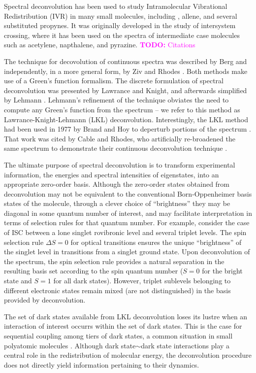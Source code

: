 \documentclass[12pt]{mitthesis}
\newcommand{\TODO} [1]{\textcolor{magenta}{\textbf{TODO:} #1}}
\begin{document}
Spectral deconvolution has been used to study Intramolecular
Vibrational Redistribution (IVR) in many small molecules, including
, allene, and several substituted propynes.  It was originally
developed in the study of intersystem crossing, where it has been used
on the spectra of intermediate case molecules such as acetylene,
napthalene, and pyrazine. \TODO{Citations}

The technique for decovolution of continuous spectra was described by
Berg and independently, in a more general form, by Ziv and Rhodes
\cite{berg76, ziv76}.  Both methods make use of a Green's function
formalism.  The discrete formulation of spectral deconvolution was
presented by Lawrance and Knight, and afterwards simplified by Lehmann
\cite{lawrance85, lehmann91}.  Lehmann's refinement of the technique
obviates the need to compute any Green's function from the spectrum --
we refer to this method as Lawrance-Knight-Lehmann (LKL)
deconvolution.  Interestingly, the LKL method had been used in 1977 by
Brand and Hoy to deperturb portions of the  spectrum
\cite{brand77}.  That work was cited by Cable and Rhodes, who
artificially re-broadened the same spectrum to demonstrate their
continuous deconvolution technique \cite{cable80}.

The ultimate purpose of spectral deconvolution is to transform
experimental information, the energies and spectral intensities of
eigenstates, into an appropriate zero-order basis.  Although the
zero-order states obtained from deconvolution may not be equivalent to
the conventional Born-Oppenheimer basis states of the molecule,
through a clever choice of ``brightness'' they may be diagonal in some
quantum number of interest, and may facilitate interpretation in terms
of selection rules for that quantum number.  For example, consider the
case of ISC between a lone singlet rovibronic level and several
triplet levels.  The spin selection rule $\Delta S=0$ for optical
transitions ensures the unique ``brightness'' of the singlet level in
transitions from a singlet ground state.  Upon deconvolution of the
spectrum, the spin selection rule provides a natural separation in the
resulting basis set according to the spin quantum number ($S=0$ for
the bright state and $S=1$ for all dark states).  However, triplet
sublevels belonging to different electronic states remain mixed (are
not distinguished) in the basis provided by deconvolution.

The set of dark states available from LKL deconvolution loses its
lustre when an interaction of interest occurrs within the set of dark
states.  This is the case for sequential coupling among tiers of dark
states, a common situation in small polyatomic molecules
\cite{tramer05}.  Although dark state$\sim$dark state interactions
play a central role in the redistribution of molecular energy, the
deconvolution procedure does not directly yield information pertaining
to their dynamics.
\end{document}
